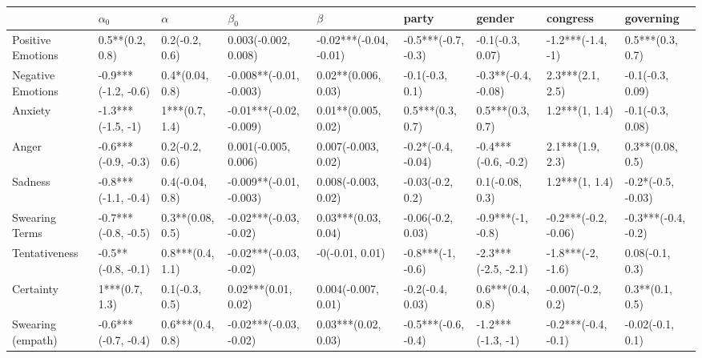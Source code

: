 \begin{tabular}{lllllllll}
\toprule
{} &           $\alpha_0$ &           $\alpha$ &                $\beta_0$ &                 $\beta$ &                party &               gender &              congress &            governing \\
\midrule
Positive Emotions     &      0.5**(0.2, 0.8) &     0.2(-0.2, 0.6) &     0.003(-0.002, 0.008) &  -0.02***(-0.04, -0.01) &  -0.5***(-0.7, -0.3) &     -0.1(-0.3, 0.07) &     -1.2***(-1.4, -1) &     0.5***(0.3, 0.7) \\
Negative Emotions     &  -0.9***(-1.2, -0.6) &    0.4*(0.04, 0.8) &  -0.008**(-0.01, -0.003) &     0.02**(0.006, 0.03) &      -0.1(-0.3, 0.1) &  -0.3**(-0.4, -0.08) &      2.3***(2.1, 2.5) &     -0.1(-0.3, 0.09) \\
Anxiety               &    -1.3***(-1.5, -1) &     1***(0.7, 1.4) &  -0.01***(-0.02, -0.009) &     0.01**(0.005, 0.02) &     0.5***(0.3, 0.7) &     0.5***(0.3, 0.7) &        1.2***(1, 1.4) &     -0.1(-0.3, 0.08) \\
Anger                 &  -0.6***(-0.9, -0.3) &     0.2(-0.2, 0.6) &     0.001(-0.005, 0.006) &     0.007(-0.003, 0.02) &   -0.2*(-0.4, -0.04) &  -0.4***(-0.6, -0.2) &      2.1***(1.9, 2.3) &     0.3**(0.08, 0.5) \\
Sadness               &  -0.8***(-1.1, -0.4) &    0.4(-0.04, 0.8) &  -0.009**(-0.01, -0.003) &     0.008(-0.003, 0.02) &     -0.03(-0.2, 0.2) &      0.1(-0.08, 0.3) &        1.2***(1, 1.4) &   -0.2*(-0.5, -0.03) \\
Swearing Terms        &  -0.7***(-0.8, -0.5) &   0.3**(0.08, 0.5) &   -0.02***(-0.03, -0.02) &     0.03***(0.03, 0.04) &    -0.06(-0.2, 0.03) &    -0.9***(-1, -0.8) &  -0.2***(-0.2, -0.06) &  -0.3***(-0.4, -0.2) \\
Tentativeness         &   -0.5**(-0.8, -0.1) &   0.8***(0.4, 1.1) &   -0.02***(-0.03, -0.02) &         -0(-0.01, 0.01) &    -0.8***(-1, -0.6) &  -2.3***(-2.5, -2.1) &     -1.8***(-2, -1.6) &      0.08(-0.1, 0.3) \\
Certainty             &       1***(0.7, 1.3) &     0.1(-0.3, 0.5) &      0.02***(0.01, 0.02) &     0.004(-0.007, 0.01) &     -0.2(-0.4, 0.03) &     0.6***(0.4, 0.8) &     -0.007(-0.2, 0.2) &      0.3**(0.1, 0.5) \\
Swearing (empath)     &  -0.6***(-0.7, -0.4) &   0.6***(0.4, 0.8) &   -0.02***(-0.03, -0.02) &     0.03***(0.02, 0.03) &  -0.5***(-0.6, -0.4) &    -1.2***(-1.3, -1) &   -0.2***(-0.4, -0.1) &     -0.02(-0.1, 0.1) \\

\end{tabular}
